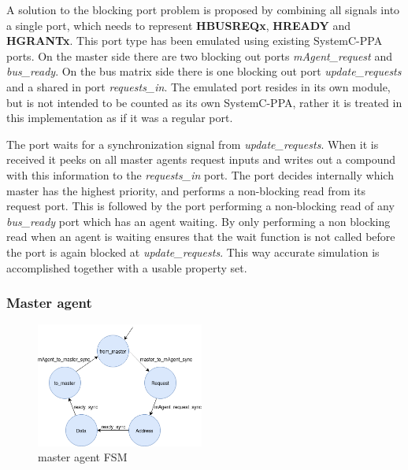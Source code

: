 A solution to the blocking port problem is proposed by combining all signals into a single port, which needs to represent \textbf{HBUSREQx}, \textbf{HREADY} and \textbf{HGRANTx}. This port type has been emulated using existing SystemC-PPA ports. On the master side there are two blocking out ports \textit{mAgent\_request} and \textit{bus\_ready}. On the bus matrix side there is one blocking out port \textit{update\_requests} and a shared in port \textit{requests\_in}. The emulated
port resides in its own module, but is not intended to be counted as its own SystemC-PPA, rather it is treated in this implementation as if it was a regular
port. \par
The port waits for a synchronization signal from \textit{update\_requests}. When it is received it peeks on all master agents request inputs and writes out a compound with this information to the \textit{requests\_in} port. The port decides internally which master has the highest priority, and performs a non-blocking read from its request port. This is followed by the port performing a non-blocking read of any \textit{bus\_ready} port which has an agent waiting. 
By only performing a non blocking read when an agent is waiting ensures that the wait function is not called before the port is again blocked at \textit{update\_requests}. This way accurate simulation is accomplished together with a usable property set. \par

\subsubsection{Master agent}
\begin{figure}
\includegraphics[width=5.5cm]{figs/ESL/mAgent_ESL.png}
\caption{master agent FSM}\label{fig:eafsm}
\end{figure}

